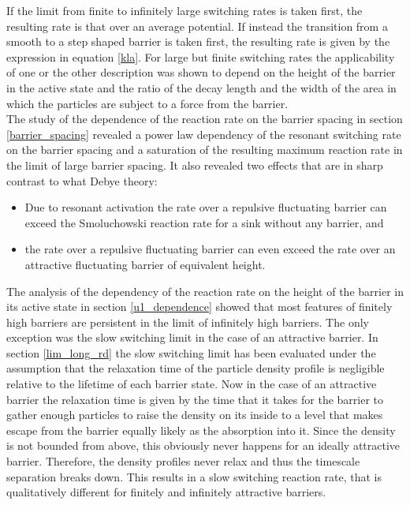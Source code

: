 If the limit from finite to infinitely large switching rates is taken first, the resulting rate is that over an average potential. If instead the transition from a smooth to a step shaped barrier is taken first, the resulting rate is given by the expression in equation \eqref{kla}. For large but finite switching rates the applicability of one or the other description was shown to depend on the height of the barrier in the active state and the ratio of the decay length and the width of the area in which the particles are subject to a force from the barrier. \\
The study of the dependence of the reaction rate on the barrier spacing in section \ref{barrier_spacing} revealed a power law dependency of the resonant switching rate on the barrier spacing and a saturation of the resulting maximum reaction rate in the limit of large barrier spacing. It also revealed two effects that are in sharp contrast to what Debye theory:
\begin{itemize}
    \item Due to resonant activation the rate over a repulsive fluctuating barrier can exceed the Smoluchowski reaction rate for a sink without any barrier, and
    \item the rate over a repulsive fluctuating barrier can even exceed the rate over an attractive fluctuating barrier of equivalent height.
\end{itemize}
The analysis of the dependency of the reaction rate on the height of the barrier in its active state in section \ref{u1_dependence} showed that most features of finitely high barriers are persistent in the limit of infinitely high barriers. The only exception was the slow switching limit in the case of an attractive barrier. In section \ref{lim_long_rd} the slow switching limit has been evaluated under the assumption that the relaxation time of the particle density profile is negligible relative to the lifetime of each barrier state. Now in the case of an attractive barrier the relaxation time is given by the time that it takes for the barrier to gather enough particles to raise the density on its inside to a level that makes escape from the barrier equally likely as the absorption into it. Since the density is not bounded from above, this obviously never happens for an ideally attractive barrier. Therefore, the density profiles never relax and thus the timescale separation breaks down. This results in a slow switching reaction rate, that is qualitatively different for finitely and infinitely attractive barriers. \\
